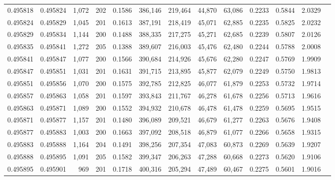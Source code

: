 \begin{tabular}{rrrrrrrrrrrrr}
0.495818 & 0.495824 & 1,072 & 202 &                                     0.1586 & 386,146 & 219,464 &  44,870 &  63,086 & 0.2233 & 0.5844 & 2.0329 \\
0.495824 & 0.495829 & 1,045 & 201 &                                     0.1613 & 387,191 & 218,419 &  45,071 &  62,885 & 0.2235 & 0.5825 & 2.0232 \\
0.495829 & 0.495834 & 1,144 & 200 &                                     0.1488 & 388,335 & 217,275 &  45,271 &  62,685 & 0.2239 & 0.5807 & 2.0126 \\
0.495835 & 0.495841 & 1,272 & 205 &                                     0.1388 & 389,607 & 216,003 &  45,476 &  62,480 & 0.2244 & 0.5788 & 2.0008 \\
0.495841 & 0.495847 & 1,077 & 200 &                                     0.1566 & 390,684 & 214,926 &  45,676 &  62,280 & 0.2247 & 0.5769 & 1.9909 \\
0.495847 & 0.495851 & 1,031 & 201 &                                     0.1631 & 391,715 & 213,895 &  45,877 &  62,079 & 0.2249 & 0.5750 & 1.9813 \\
0.495851 & 0.495856 & 1,070 & 200 &                                     0.1575 & 392,785 & 212,825 &  46,077 &  61,879 & 0.2253 & 0.5732 & 1.9714 \\
0.495857 & 0.495863 & 1,058 & 201 &                                     0.1597 & 393,843 & 211,767 &  46,278 &  61,678 & 0.2256 & 0.5713 & 1.9616 \\
0.495863 & 0.495871 & 1,089 & 200 &                                     0.1552 & 394,932 & 210,678 &  46,478 &  61,478 & 0.2259 & 0.5695 & 1.9515 \\
0.495871 & 0.495877 & 1,157 & 201 &                                     0.1480 & 396,089 & 209,521 &  46,679 &  61,277 & 0.2263 & 0.5676 & 1.9408 \\
0.495877 & 0.495883 & 1,003 & 200 &                                     0.1663 & 397,092 & 208,518 &  46,879 &  61,077 & 0.2266 & 0.5658 & 1.9315 \\
0.495883 & 0.495888 & 1,164 & 204 &                                     0.1491 & 398,256 & 207,354 &  47,083 &  60,873 & 0.2269 & 0.5639 & 1.9207 \\
0.495888 & 0.495895 & 1,091 & 205 &                                     0.1582 & 399,347 & 206,263 &  47,288 &  60,668 & 0.2273 & 0.5620 & 1.9106 \\
0.495895 & 0.495901 &   969 & 201 &                                     0.1718 & 400,316 & 205,294 &  47,489 &  60,467 & 0.2275 & 0.5601 & 1.9016 \\

\end{tabular}
